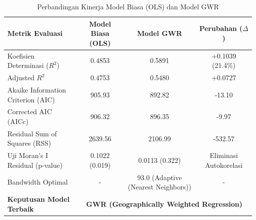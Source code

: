 \begin{table}[htbp]
\centering
\caption{Perbandingan Kinerja Model Biasa (OLS) dan Model GWR}
\label{tab:ols_vs_gwr_comparison}
\begin{tabular}{lccc}
\toprule
\textbf{Metrik Evaluasi} & \textbf{Model Biasa (OLS)} & \textbf{Model GWR} & \textbf{Perubahan ($\Delta$)} \\
\midrule
Koefisien Determinasi ($R^2$) & 0.4853 & 0.5891 & +0.1039 (21.4\%) \\
Adjusted $R^2$ & 0.4753 & 0.5480 & +0.0727 \\
Akaike Information Criterion (AIC) & 905.93 & 892.82 & -13.10 \\
Corrected AIC (AICc) & 906.32 & 896.35 & -9.97 \\
Residual Sum of Squares (RSS) & 2639.56 & 2106.99 & -532.57 \\
Uji Moran's I Residual (p-value) & 0.1022 (0.019) & 0.0113 (0.322) & Eliminasi Autokorelasi \\
Bandwidth Optimal & - & 93.0 (Adaptive (Nearest Neighbors)) & - \\
\midrule
\textbf{Keputusan Model Terbaik} & \multicolumn{3}{c}{\textbf{GWR (Geographically Weighted Regression)}} \\
\bottomrule
\end{tabular}
\end{table}
